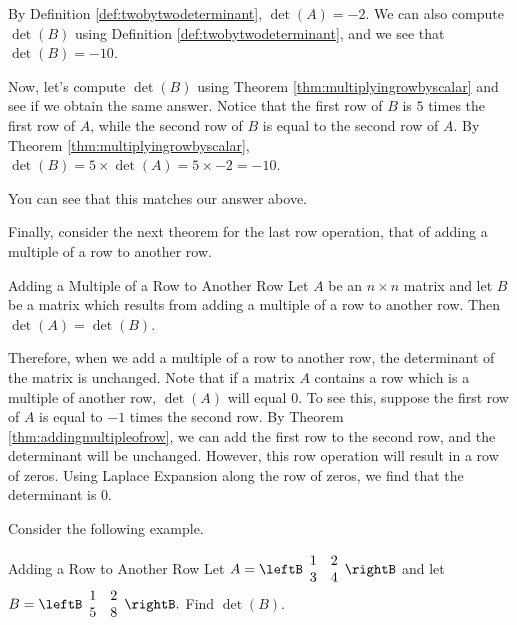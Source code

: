 \begin{solution} 
By Definition \ref{def:twobytwodeterminant}, $\det \left( A\right) =-2.$ We can also compute
$\det \left(B\right)$ using Definition \ref{def:twobytwodeterminant}, and we see that $\det \left(B\right) = -10$. 

Now, let's compute  $\det \left(B\right)$ using Theorem \ref{thm:multiplyingrowbyscalar} and see if we
obtain the same answer. Notice that the first row of $B$ is $5$ times the first row of $A$, while the
second row of $B$ is equal to the second row of $A$. 
By Theorem \ref{thm:multiplyingrowbyscalar}, 
$\det  \left( B \right) = 5 \times \det \left( A \right) = 5 \times -2 = -10.$

You can see that this matches our answer above.
\end{solution}

Finally, consider the next theorem for the last row operation, that of adding a multiple of a row
to another row. 

\begin{theorem}{Adding a Multiple of a Row to Another Row}\label{thm:addingmultipleofrow}
Let $A$ be an $n\times n$ matrix and let $B$ be a matrix
which results from adding a multiple of a row to another row.
 Then $\det \left( A\right) =\det
\left( B \right) $.
\end{theorem}

Therefore, when we add a multiple of a row to another row, the determinant of the matrix is unchanged. 
Note that if a matrix $A$ contains a row which is a multiple of another row, $\det \left(A\right)$ will equal $0$. To see this,
suppose the first row of $A$ is equal to $-1$ times the second row. By Theorem \ref{thm:addingmultipleofrow}, we can 
add the first row to the second row, and the determinant will be unchanged. However, this row operation will result in a row of zeros.
Using Laplace Expansion along the row of zeros, we find that the determinant is $0$. 

Consider the following example.

\begin{example}{Adding a Row to Another Row}\label{exa:addingrow}
Let $A=\leftB
\begin{array}{rr}
1 & 2 \\
3 & 4
\end{array}
\rightB $ and let $B=\leftB
\begin{array}{rr}
1 & 2 \\
5 & 8
\end{array}
\rightB .$ 
Find $\det \left(B\right)$.
\end{example}

